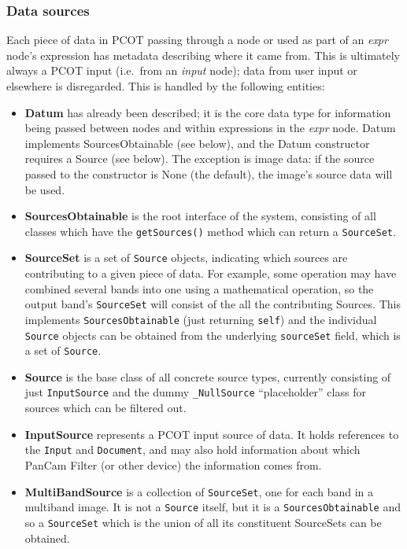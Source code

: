 \subsubsection{Data sources}
\label{sources}
Each piece of data in PCOT passing through a node or used as part of an
\emph{expr} node's expression has metadata describing where it came from.
This is ultimately always a PCOT input (i.e.\ from an \emph{input} node);
data from user input or elsewhere is disregarded. This is handled by the following
entities:
\begin{itemize}
\item \textbf{Datum} has already been described; it is the core data type for information
being passed between nodes and within expressions in the \emph{expr} node. Datum implements SourcesObtainable
(see below), and the Datum constructor requires a Source (see below). The exception is image data: if the source passed
to the constructor is None (the default), the image's source data will be used.
\item \textbf{SourcesObtainable} is the root interface of the system, consisting of
all classes which have the \texttt{getSources()} method which can return a 
\texttt{SourceSet}.
\item \textbf{SourceSet} is a set of \texttt{Source} objects, indicating which
sources are contributing to a given piece of data. For example, some operation
may have combined several bands into one using a mathematical operation, so
the output band's \texttt{SourceSet} will consist of the all the contributing Sources.
This implements \texttt{SourcesObtainable} (just returning \texttt{self}) and
the individual \texttt{Source} objects can be obtained from the underlying
\texttt{sourceSet} field, which is a set of \texttt{Source}.
\item \textbf{Source} is the base class of all concrete source types, currently consisting
of just \texttt{InputSource} and the dummy \texttt{\_NullSource} ``placeholder'' class for
sources which can be filtered out. 
\item \textbf{InputSource} represents a PCOT input source of data. It holds references to
the \texttt{Input} and \texttt{Document}, and may also hold information about which
PanCam Filter (or other device)
the information comes from.
\item \textbf{MultiBandSource} is a collection of \texttt{SourceSet}, one for each band in a multiband
image. It is not a \texttt{Source} itself, but it is a \texttt{SourcesObtainable} and so
a \texttt{SourceSet} which is the union of all its constituent SourceSets can be obtained.
\end{itemize}
